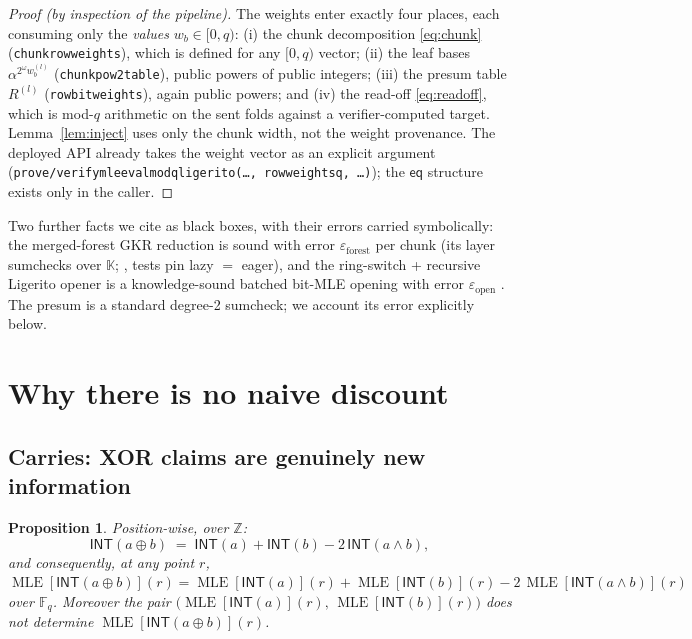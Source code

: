 \documentclass[11pt]{article}
\newcommand{\F}{\mathbb{F}}
\newcommand{\Z}{\mathbb{Z}}
\newcommand{\K}{\mathbb{K}}            %
\newcommand{\Fq}{\F_q}                 %
\newcommand{\INT}{\mathsf{INT}}
\newcommand{\eq}{\mathsf{eq}}
\DeclareRobustCommand{\code}[1]{{\def\_{\textunderscore\allowbreak}\texttt{#1}}}
\DeclareMathOperator{\MLE}{MLE}
\theoremstyle{plain}
\newtheorem{proposition}[theorem]{Proposition}
\theoremstyle{definition}
\theoremstyle{remark}
\begin{document}
\begin{proof}[Proof (by inspection of the pipeline)]
The weights enter exactly four places, each consuming only the \emph{values}
$w_b\in[0,q)$: (i) the chunk decomposition \eqref{eq:chunk}
(\code{chunk\_row\_weights}), which is defined for any $[0,q)$ vector;
(ii) the leaf bases $\alpha^{2^{\omega}w_b^{(l)}}$
(\code{chunk\_pow2\_table}), public powers of public integers; (iii) the
presum table $R^{(l)}$ (\code{row\_bit\_weights}), again public powers; and
(iv) the read-off \eqref{eq:readoff}, which is mod-$q$ arithmetic on the sent
folds against a verifier-computed target. Lemma~\ref{lem:inject} uses only the
chunk width, not the weight provenance. The deployed API already takes the
weight vector as an explicit argument
(\code{prove/verify\_mle\_eval\_mod\_q\_ligerito(\ldots, row\_weights\_q,
\ldots)}); the $\eq$ structure exists only in the caller.
\end{proof}

Two further facts we cite as black boxes, with their errors carried
symbolically: the merged-forest GKR reduction is sound with error
$\varepsilon_{\mathrm{forest}}$ per chunk (its layer sumchecks over $\K$;
\cite{F2Zdesign}, tests pin lazy $=$ eager), and the ring-switch + recursive
Ligerito opener is a knowledge-sound batched bit-MLE opening with error
$\varepsilon_{\mathrm{open}}$ \cite{Flock,DP24,F2Zverifier}. The presum is a
standard degree-2 sumcheck; we account its error explicitly below.

\section{Why there is no naive discount}\label{sec:naive}

\subsection{Carries: XOR claims are genuinely new information}\label{sec:carrylore}

\begin{proposition}\label{prop:carry}
Position-wise, over $\Z$:
\begin{equation}\label{eq:xorid}
  \INT(a\oplus b) \;=\; \INT(a) + \INT(b) - 2\,\INT(a\wedge b),
\end{equation}
and consequently, at any point $r$,
$\MLE[\INT(a\oplus b)](r) = \MLE[\INT(a)](r) + \MLE[\INT(b)](r) -
2\,\MLE[\INT(a\wedge b)](r)$ over $\Fq$. Moreover the pair
$\bigl(\MLE[\INT(a)](r),\,\MLE[\INT(b)](r)\bigr)$ does \emph{not} determine
$\MLE[\INT(a\oplus b)](r)$.
\end{proposition}
\end{document}
